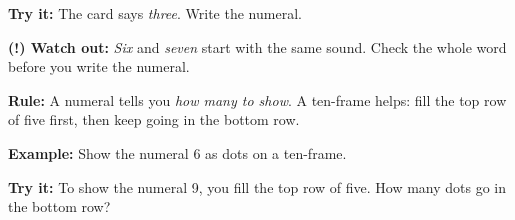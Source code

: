 \documentclass[12pt]{article}
\begin{document}
\begin{tryitbox}
\textbf{Try it:} \quad The card says \emph{three}. Write the numeral.\\[2pt]
\end{tryitbox}

\begin{watchoutbox}
\textbf{(!) Watch out:} \emph{Six} and \emph{seven} start with the same sound.
Check the whole word before you write the numeral.
\end{watchoutbox}


\begin{formulabox}
\textbf{Rule:} A numeral tells you \emph{how many to show}. A ten-frame helps:
fill the top row of five first, then keep going in the bottom row.
\end{formulabox}

\begin{examplebox}
\textbf{Example:} \quad Show the numeral 6 as dots on a ten-frame.
\end{examplebox}

\begin{tryitbox}
\textbf{Try it:} \quad To show the numeral 9, you fill the top row of five.
How many dots go in the bottom row?\\[2pt]
\end{tryitbox}
\end{document}
